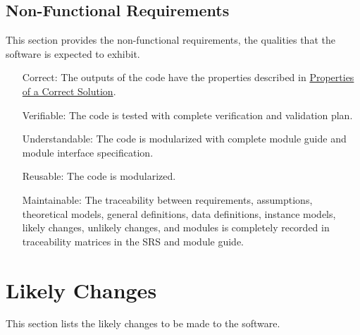 \documentclass[12pt]{article}
\begin{document}
\subsection{Non-Functional Requirements}
\label{Sec:NFRs}
This section provides the non-functional requirements, the qualities that the software is expected to exhibit.

\begin{itemize}
\item[Correct:\phantomsection\label{correct}]{The outputs of the code have the properties described in \hyperref[Sec:CorSolProps]{Properties of a Correct Solution}.}
\item[Verifiable:\phantomsection\label{verifiable}]{The code is tested with complete verification and validation plan.}
\item[Understandable:\phantomsection\label{understandable}]{The code is modularized with complete module guide and module interface specification.}
\item[Reusable:\phantomsection\label{reusable}]{The code is modularized.}
\item[Maintainable:\phantomsection\label{maintainable}]{The traceability between requirements, assumptions, theoretical models, general definitions, data definitions, instance models, likely changes, unlikely changes, and modules is completely recorded in traceability matrices in the SRS and module guide.}
\end{itemize}
\section{Likely Changes}
\label{Sec:LCs}
This section lists the likely changes to be made to the software.
\end{document}
